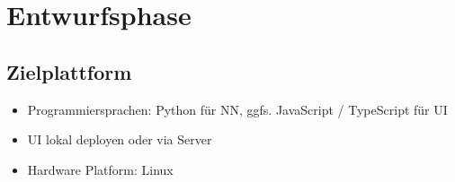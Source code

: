 \section{Entwurfsphase} 
\label{sec:Entwurfsphase}

\subsection{Zielplattform}
\label{sec:Zielplattform}

\begin{itemize}
	\item Programmiersprachen: Python f\"ur NN, ggfs. JavaScript / TypeScript f\"ur UI
	\item UI lokal deployen oder via Server
	\item Hardware Platform: Linux
\end{itemize}

